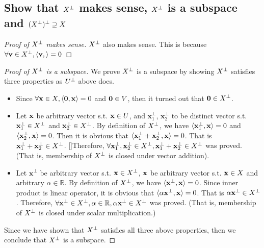 \documentclass[11pt,a4paper]{article}
\begin{document}
\newpage
\newcommand{\xtvec}{\mathbf{x}^{\perp}}
\subsection{Show that $X^{\perp}$ makes sense, $X^{\perp}$ is a subspace and
    $(X^{\perp})^{\perp} \supseteq X$}
\begin{proof}[Proof of $X^{\perp}$ makes sense]
    $X^{\perp}$ also makes sense. This is because $\forall \mathbf{v} \in X^{\perp}, \langle
    \mathbf{v}, \rangle = 0$
\end{proof}
\begin{proof}[Proof of $X^{\perp}$ is a subspace]
    We prove $X^{\perp}$ is a subspace by showing $X^{\perp}$ satisfies three properties
    as $U^{\perp}$ above does. 
    \begin{itemize}
        \item Since $\forall \mathbf{x} \in X, \langle \mathbf{0}, \mathbf{x} \rangle = 0$
            and $\mathbf{0} \in V$, then it turned out that $\mathbf{0} \in X^{\perp}$.
        \item Let $\mathbf{x}$ be arbitrary vector s.t. $\mathbf{x} \in U$, and
            $\xtvec_1$, $\xtvec_2$ to be distinct vector s.t. $\xtvec_1 \in \Xt$
            and $\xtvec_2 \in \Xt$. By definition of $X^{\perp}$, we have 
            $\langle \xtvec_1, \xvec \rangle = 0$ and 
            $\langle \xtvec_2, \xvec \rangle = 0$. 
            Then it is obvious that 
            $\langle \xtvec_1 + \xtvec_2, \xvec \rangle = 0$. 
            That is $\xtvec_1 +\xtvec_2 \in \Xt$.
            []Therefore, $\forall \xtvec_1, \xtvec_2 \in \Xt,
            \xtvec_1+\xtvec_2 \in \Xt$ was proved. (That is, membership of
            $X^{\perp}$ is closed under vector addition).
        \item Let $\xtvec$ be arbitrary vector s.t. $\mathbf{x} \in X^{\perp}$, 
            $\mathbf{x}$ be arbitrary vector s.t. $\mathbf{x} \in X$ and
            arbitrary $\alpha \in \mathbb{R}$. By definition of $X^{\perp}$, we have 
            $\langle \xtvec, \xvec \rangle = 0$. 
            Since inner product is linear operator, it is obvious that
            $\langle \alpha \xtvec, \xvec \rangle = 0$. 
            That is $\alpha \xtvec \in \Xt$.
            Therefore, $\forall \xtvec \in \Xt, \alpha \in \mathbb{R}, \alpha
            \xtvec \in \Xt$ was proved. (That is, membership of $X^{\perp}$ is
            closed under scalar multiplication.)
    \end{itemize}
    Since we have shown that $X^{\perp}$ satisfies all three above properties, then
    we conclude that $X^{\perp}$ is a subspace.
\end{proof}
\end{document}
